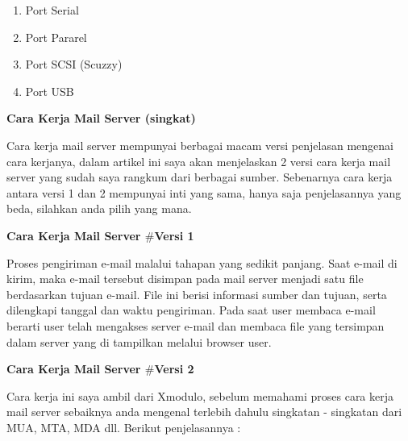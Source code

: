 \noindent 
\begin{enumerate}
\item Port Serial \par
\noindent 
\item Port Pararel \par
\noindent 
\item Port SCSI (Scuzzy) \par
\noindent 
\item Port USB \end{enumerate}
 \par
\vspace{12pt}
\noindent 
\textbf{Cara Kerja Mail Server (singkat)} \par
Cara kerja mail server mempunyai berbagai macam versi penjelasan mengenai cara kerjanya, dalam artikel ini saya akan menjelaskan 2 versi cara kerja mail server yang sudah saya rangkum dari berbagai sumber. Sebenarnya cara kerja antara versi 1 dan 2 mempunyai inti yang sama, hanya saja penjelasannya yang beda, silahkan anda pilih yang mana. \par
\vspace{12pt}
\noindent 
\textbf{Cara Kerja Mail Server  $  \#  $Versi 1} \par
Proses pengiriman e-mail malalui tahapan yang sedikit panjang. Saat e-mail di kirim, maka e-mail tersebut disimpan pada mail server menjadi satu file berdasarkan tujuan e-mail. File ini berisi informasi sumber dan tujuan, serta dilengkapi tanggal dan waktu pengiriman. Pada saat user membaca e-mail berarti user telah mengakses server e-mail dan membaca file yang tersimpan dalam server yang di tampilkan melalui browser user. \par
\vspace{12pt}
\noindent 
\textbf{Cara Kerja Mail Server  $  \#  $Versi 2} \par
Cara kerja ini saya ambil dari Xmodulo, sebelum memahami proses cara kerja mail server sebaiknya anda mengenal terlebih dahulu singkatan - singkatan dari MUA, MTA, MDA dll. Berikut penjelasannya : \par
\vspace{12pt}
\noindent 
